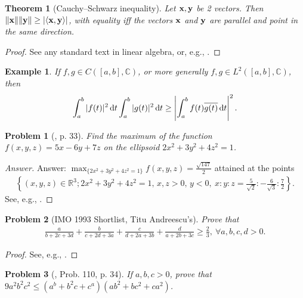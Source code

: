 \documentclass[oneside]{book}
\numberwithin{equation}{section}
\newtheorem{example}{Example}[section]
\newtheorem{problem}{Problem}[section]
\newtheorem{theorem}{Theorem}[section]
\begin{document}
\begin{theorem}[Cauchy--Schwarz inequality]
	Let ${\bf x},{\bf y}$ be 2 vectors. Then $\|{\bf x}\|\|{\bf y}\|\ge|\langle{\bf x},{\bf y}\rangle|$, with equality iff the vectors ${\bf x}$ and ${\bf y}$ are parallel and point in the same direction.
\end{theorem}

\begin{proof}[Proof]
	See any standard text in linear algebra, or, e.g., \cite[p. 33]{Gelca_Andreescu2017}.
\end{proof}

\begin{example}
	If $f,g\in C([a,b],\mathbb{C})$, or more generally $f,g\in L^2([a,b],\mathbb{C})$, then
	\begin{align*}
		\int_a^b |f(t)|^2\,{\rm d}t\int_a^b |g(t)|^2\,{\rm d}t\ge\left|\int_a^b f(t)\overline{g(t)}\,{\rm d}t\right|^2.
	\end{align*}
\end{example}

\begin{problem}[\cite{Gelca_Andreescu2017}, p. 33]
	Find the maximum of the function $f(x,y,z) = 5x - 6y + 7z$ on the ellipsoid $2x^2 + 3y^2 + 4z^2 = 1$.
\end{problem}

\begin{proof}[Answer]
	Answer: $\max_{\{2x^2 + 3y^2 + 4z^2 = 1\}} f(x,y,z) = \frac{\sqrt{147}}{2}$ attained at the points
	\begin{align*}
		\left\{(x,y,z)\in\mathbb{R}^3;2x^2 + 3y^2 + 4z^2 = 1,\,x,z > 0,\, y < 0,\ x:y:z = \frac{5}{\sqrt{2}}:-\frac{6}{\sqrt{3}}:\frac{7}{2}\right\}.
	\end{align*}
	See, e.g., \cite[p. 33]{Gelca_Andreescu2017}.
\end{proof}

\begin{problem}[IMO 1993 Shortlist, Titu Andreescu's]
	Prove that
	\begin{align*}
		\frac{a}{b + 2c + 3d} + \frac{b}{c + 2d + 3a} + \frac{c}{d + 2a + 3b} + \frac{d}{a + 2b + 3c}\ge\frac{2}{3},\ \forall a,b,c,d > 0.
	\end{align*}
\end{problem}

\begin{proof}[Proof]
	See, e.g., \cite[p. 34]{Gelca_Andreescu2017}.
\end{proof}

\begin{problem}[\cite{Gelca_Andreescu2017}, Prob. 110, p. 34]
	If $a,b,c > 0$, prove that $9a^2b^2c^2\le(a^b + b^2c + c^a)(ab^2 + bc^2 + ca^2)$.
\end{problem}
\end{document}
